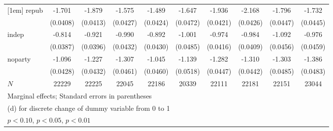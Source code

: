{\begin{tabular}{l*{9}{c}}
[1em]
repub       &      -1.701\sym{***}&      -1.879\sym{***}&      -1.575\sym{***}&      -1.489\sym{***}&      -1.647\sym{***}&      -1.936\sym{***}&      -2.168\sym{***}&      -1.796\sym{***}&      -1.732\sym{***}\\
            &    (0.0408)         &    (0.0413)         &    (0.0427)         &    (0.0424)         &    (0.0472)         &    (0.0421)         &    (0.0426)         &    (0.0447)         &    (0.0445)         \\
[1em]
indep       &      -0.814\sym{***}&      -0.921\sym{***}&      -0.990\sym{***}&      -0.892\sym{***}&      -1.001\sym{***}&      -0.974\sym{***}&      -0.984\sym{***}&      -1.092\sym{***}&      -0.976\sym{***}\\
            &    (0.0387)         &    (0.0396)         &    (0.0432)         &    (0.0430)         &    (0.0485)         &    (0.0416)         &    (0.0409)         &    (0.0456)         &    (0.0459)         \\
[1em]
noparty     &      -1.096\sym{***}&      -1.227\sym{***}&      -1.307\sym{***}&      -1.045\sym{***}&      -1.139\sym{***}&      -1.282\sym{***}&      -1.310\sym{***}&      -1.303\sym{***}&      -1.386\sym{***}\\
            &    (0.0428)         &    (0.0432)         &    (0.0461)         &    (0.0460)         &    (0.0518)         &    (0.0447)         &    (0.0442)         &    (0.0485)         &    (0.0483)         \\
\hline
\(N\)       &       22229         &       22225         &       22045         &       22186         &       20339         &       22111         &       22181         &       22151         &       23044         \\
\hline\hline
\multicolumn{10}{l}{\footnotesize Marginal effects; Standard errors in parentheses}\\
\multicolumn{10}{l}{\footnotesize  (d) for discrete change of dummy variable from 0 to 1}\\
\multicolumn{10}{l}{\footnotesize \sym{*} \(p<0.10\), \sym{**} \(p<0.05\), \sym{***} \(p<0.01\)}\\
\end{tabular}
}
